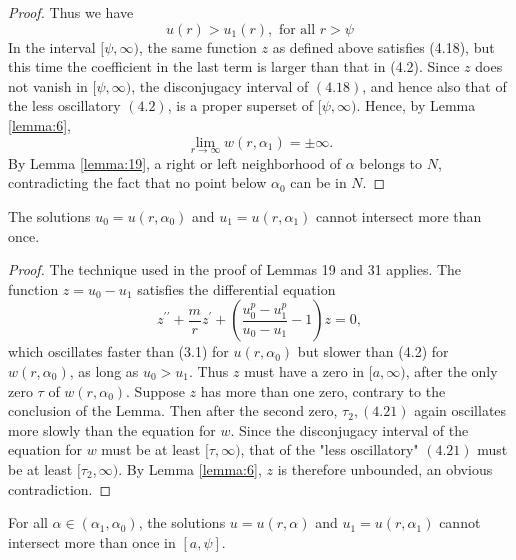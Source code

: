 \begin{proof}
  Thus we have
  \begin{equation}\label{eq:4.19}
    u(r)>u_1(r), \text { for all } r>\psi    
  \end{equation}
  In the interval $[\psi, \infty)$, the same function $z$ as defined above satisfies (4.18), but this time the coefficient in the last term is larger than that in (4.2). Since $z$ does
  not vanish in $[\psi, \infty)$, the disconjugacy interval of $(4.18)$, and hence also that of the less oscillatory $(4.2)$, is a proper superset of $[\psi, \infty)$. Hence, by Lemma \ref{lemma:6},
  \begin{equation}\label{eq:4.20}
    \lim _{r \rightarrow \infty} w\left(r, \alpha_1\right)=\pm \infty.  
  \end{equation}
  By Lemma \ref{lemma:19}, a right or left neighborhood of $\alpha$ belongs to $N$, contradicting the fact that no point below $\alpha_0$ can be in $N$.
\end{proof}

\begin{lemma}\label{lemma:32}
  The solutions $u_0=u\left(r, \alpha_0\right)$ and $u_1=u\left(r, \alpha_1\right)$ cannot 
  intersect more than once.
\end{lemma}

\begin{proof}
  The technique used in the proof of Lemmas 19 and 31 applies.
  The function $z=u_0-u_1$ satisfies the differential equation
  \begin{equation}\label{eq:4.21}
    z^{\prime \prime}+\frac{m}{r} z^{\prime}+\left(\frac{u_0^p-u_1^p}{u_0-u_1}-1\right) z=0,  
  \end{equation}
  which oscillates faster than (3.1) for $u\left(r, \alpha_0\right)$ but slower than (4.2)
  for $w\left(r, \alpha_0\right)$, as long as $u_0>u_1$.
  Thus $z$ must have a zero in $[a, \infty)$, after the only zero $\tau$
  of $w\left(r, \alpha_0\right)$. Suppose $z$ has more than one zero,
  contrary to the conclusion of the Lemma. Then after the second zero,
  $\tau_2,(4.21)$ again oscillates more slowly than the equation for $w$.
  Since the disconjugacy interval of the equation for $w$ must be
  at least $[\tau, \infty)$, that of the "less oscillatory" $(4.21)$
  must be at least $[\tau_2, \infty)$. By Lemma \ref{lemma:6}, $z$ is therefore unbounded,
  an obvious contradiction.
\end{proof}

\begin{lemma}\label{lemma:33}
  For all $\alpha \in\left(\alpha_1, \alpha_0\right)$, the solutions $u=u(r, \alpha)$ and
  $u_1=u\left(r, \alpha_1\right)$ cannot intersect more than once in $[a, \psi]$.
\end{lemma}

